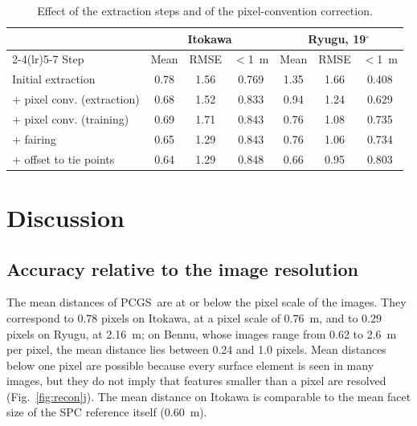 \documentclass[fleqn,usenatbib]{aa}
\newcommand{\pcgs}{PCGS}
\begin{document}
\begin{table}
\caption{Effect of the extraction steps and of the pixel-convention correction.}
\label{tab:pipeline}
\centering
\footnotesize\setlength{\tabcolsep}{2.6pt}
\begin{tabular}{@{}lcccccc@{}}
\toprule
 & \multicolumn{3}{c}{Itokawa} & \multicolumn{3}{c}{Ryugu, 19$^\circ$} \\
\cmidrule(lr){2-4}\cmidrule(lr){5-7}
Step & Mean & RMSE & $<$1~m & Mean & RMSE & $<$1~m \\
\midrule
Initial extraction                    & 0.78 & 1.56 & 0.769 & 1.35 & 1.66 & 0.408 \\
+ pixel conv. (extraction) & 0.68 & 1.52 & 0.833 & 0.94 & 1.24 & 0.629 \\
+ pixel conv. (training) & 0.69 & 1.71 & 0.843 & 0.76 & 1.08 & 0.735 \\
+ fairing                             & 0.65 & 1.29 & 0.843 & 0.76 & 1.06 & 0.734 \\
+ offset to tie points & 0.64 & 1.29 & 0.848 & 0.66 & 0.95 & 0.803 \\
\bottomrule
\end{tabular}
\end{table}

\section{Discussion}
\label{sec:discussion}

\subsection{Accuracy relative to the image resolution}

The mean distances of \pcgs\ are at or below the pixel scale of the images. They correspond to 0.78 pixels on
Itokawa, at a pixel scale of 0.76~m, and to 0.29 pixels on Ryugu, at 2.16~m; on Bennu, whose images range from 0.62
to 2.6~m per pixel, the mean distance lies between 0.24 and 1.0 pixels. Mean distances below one pixel are possible because every surface
element is seen in many images, but they do not imply that features smaller than a pixel are resolved
(Fig.~\ref{fig:recon}j). The mean distance on Itokawa is comparable to the mean facet size of the SPC reference itself (0.60~m).
\end{document}
